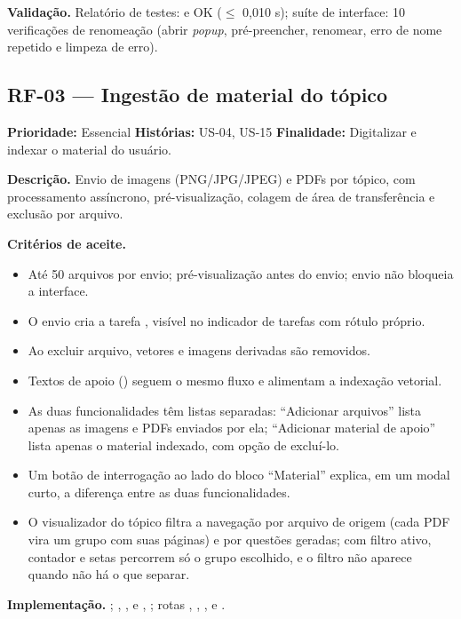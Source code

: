 \textbf{Validação.} Relatório de testes: \texttt{} e \texttt{} OK ($\leq$ 0,010 s); suíte de interface: 10 verificações de renomeação (abrir \emph{popup}, pré-preencher, renomear, erro de nome repetido e limpeza de erro).

\subsection{RF-03 --- Ingestão de material do tópico}

\textbf{Prioridade:} Essencial \quad \textbf{Histórias:} US-04, US-15 \quad \textbf{Finalidade:} Digitalizar e indexar o material do usuário.

\textbf{Descrição.} Envio de imagens (PNG/JPG/JPEG) e PDFs por tópico, com processamento assíncrono, pré-visualização, colagem de área de transferência e exclusão por arquivo.

\textbf{Critérios de aceite.}
\begin{itemize}
    \item Até 50 arquivos por envio; pré-visualização antes do envio; envio não bloqueia a interface.
    \item O envio cria a tarefa \texttt{}, visível no indicador de tarefas com rótulo próprio.
    \item Ao excluir arquivo, vetores e imagens derivadas são removidos.
    \item Textos de apoio (\texttt{}) seguem o mesmo fluxo e alimentam a indexação vetorial.
    \item As duas funcionalidades têm listas separadas: ``Adicionar arquivos'' lista apenas as imagens e PDFs enviados por ela; ``Adicionar material de apoio'' lista apenas o material indexado, com opção de excluí-lo.
    \item Um botão de interrogação ao lado do bloco ``Material'' explica, em um modal curto, a diferença entre as duas funcionalidades.
    \item O visualizador do tópico filtra a navegação por arquivo de origem (cada PDF vira um grupo com suas páginas) e por questões geradas; com filtro ativo, contador e setas percorrem só o grupo escolhido, e o filtro não aparece quando não há o que separar.
\end{itemize}

\textbf{Implementação.} ; , ,  e , ; rotas \texttt{}, \texttt{}, \texttt{}, \texttt{} e \texttt{}.

